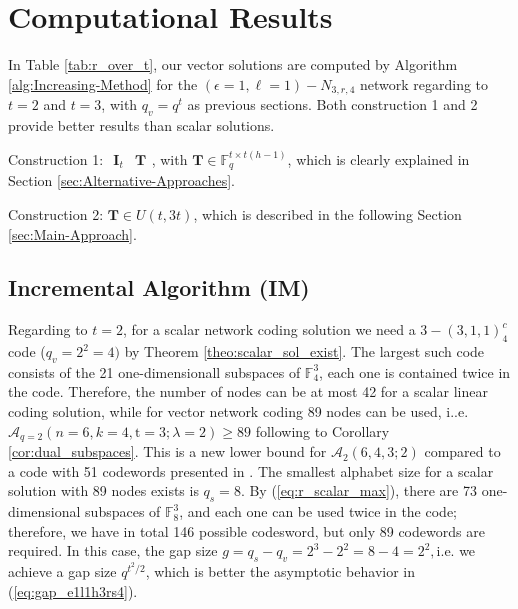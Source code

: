 \chapter{Computational Results} \label{chap:comp_method}

In Table \ref{tab:r_over_t}, our vector solutions are computed by
Algorithm \ref{alg:Increasing-Method} for the $\left(\epsilon=1,\ell=1\right)-\ensuremath{N}_{3,r,4}$
network regarding to $t=2$ and $t=3$, with $q_{v}=q^{t}$ as previous
sections. Both construction 1 and 2 provide better results than scalar
solutions. 

Construction 1: $\begin{array}{c|c}
\boldsymbol{I}_{t} & \boldsymbol{T}\end{array}$, with $\boldsymbol{T}\in\ensuremath{\mathbb{F}}_{q}^{t\times t\left(h-1\right)}$,
which is clearly explained in Section \ref{sec:Alternative-Approaches}.

Construction 2: $\boldsymbol{T}\in U\left(t,3t\right)$, which is
described in the following Section \ref{sec:Main-Approach}.

\section{Incremental Algorithm (IM) \label{sec:Main-Approach}}

Regarding to $t=2$, for a scalar network coding solution we need
a $3-\left(3,1,1\right)_{4}^{c}$ code ($q_{v}=2^{2}=4)$ by Theorem
\ref{theo:scalar_sol_exist}. The largest such code consists of the
21 one-dimensionall subspaces of $\ensuremath{\mathbb{F}}_{4}^{3}$,
each one is contained twice in the code. Therefore, the number of
nodes can be at most 42 for a scalar linear coding solution, while
for vector network coding 89 nodes can be used, i..e. $\mathcal{A}_{q=2}\left(n=6,k=4,\mathrm{t}=3;\lambda=2\right)\geq89$
following to Corollary \ref{cor:dual_subspaces}. This is a new lower
bound for $\mathcal{A}_{2}\left(6,4,3;2\right)$ compared to a code
with 51 codewords presented in \cite{Wachter-Zeh:2018}. The smallest
alphabet size for a scalar solution with 89 nodes exists is $q_{s}=8$.
By (\ref{eq:r_scalar_max}), there are 73 one-dimensional subspaces
of $\ensuremath{\mathbb{F}}_{8}^{3}$, and each one can be used twice
in the code; therefore, we have in total 146 possible codesword, but
only 89 codewords are required. In this case, the gap size $g=q_{s}-q_{v}=2^{3}-2^{2}=8-4=2^{2},$i.e.
we achieve a gap size $q^{t^{2}/2}$, which is better the asymptotic
behavior in (\ref{eq:gap_e1l1h3rs4}). 

